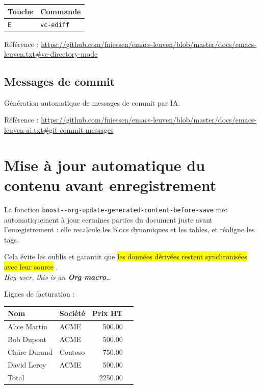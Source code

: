 \documentclass{mcreport}
\begin{document}
\begin{center}
\begin{tabular}{ll}
Touche & Commande\\
\hline
\lstinline|E| & \lstinline|vc-ediff|\\
\end{tabular}
\end{center}

Référence :
\url{https://github.com/fniessen/emacs-leuven/blob/master/docs/emacs-leuven.txt\#vc-directory-mode}
\subsection*{Messages de commit}
\label{sec:org3713301}

Génération automatique de messages de commit par IA.

Référence :
\url{https://github.com/fniessen/emacs-leuven/blob/master/docs/emacs-leuven-ai.txt\#git-commit-messages}
\section{Mise à jour automatique du contenu avant enregistrement}
\label{sec:org89624a0}

La fonction \verb|boost--org-update-generated-content-before-save| met automatiquement
à jour certaines parties du document juste avant l'enregistrement : elle
recalcule les blocs dynamiques et les tables, et réaligne les tags.

Cela évite les oublis et garantit que
\hl{les données dérivées restent synchronisées avec leur source} . \\
\emph{Hey user, this is an \textbf{Org macro}\ldots{}}

\clearpage 

Lignes de facturation :

\begin{table}[!htbp]
\label{tab:org939a32c}
\centering
\begin{tabular}{llrl}
Nom & Société & Prix HT & \\
\hline
Alice Martin & ACME & 500.00 & \texteuro{}\\
Bob Dupont & ACME & 500.00 & \texteuro{}\\
Claire Durand & Contoso & 750.00 & \texteuro{}\\
David Leroy & ACME & 500.00 & \texteuro{}\\
\hline
Total &  & 2250.00 & \texteuro{}\\
\end{tabular}
\end{table}
\end{document}
